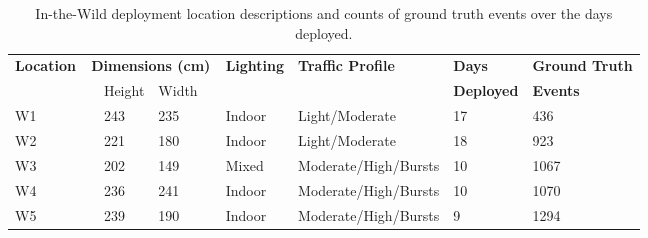 \begin{table}[t]
\footnotesize
	\begin{tabular}{@{}p{1.0in}p{0.2in}llp{0.2in}p{0.6in}p{1.3in}p{0.6in}l@{}}
	\toprule
	\multirow{2}{*}{\textbf{Location}}	&	\multicolumn{4}{c}{\textbf{Dimensions (cm)}} & \multirow{2}{*}{\textbf{Lighting}} & \multirow{2}{*}{\textbf{Traffic Profile}} & \textbf{Days}& \textbf{Ground Truth}  \\
		& & Height & Width 	&  						&	&  &   \textbf{Deployed} & \textbf{Events} \\\midrule
	W1 & & 243 & 235  & & Indoor  & Light/Moderate   & 17    & 436   \\ %
	W2 & & 221 & 180 & & Indoor  & Light/Moderate    & 18   & 923  \\ %
	W3 & & 202 & 149 & & Mixed   & Moderate/High/Bursts& 10 & 1067  \\	%
    	W4 & & 236 & 241  & & Indoor  & Moderate/High/Bursts & 10& 1070 \\ %
	W5 & & 239 & 190 & & Indoor  & Moderate/High/Bursts  & 9& 1294  \\ %
	\bottomrule
	\end{tabular}
	\caption{In-the-Wild deployment location descriptions and counts of ground truth events over the days deployed.
	\vspace{1mm}
	\label{tab:ITWcategoryfreq}}

\end{table}

